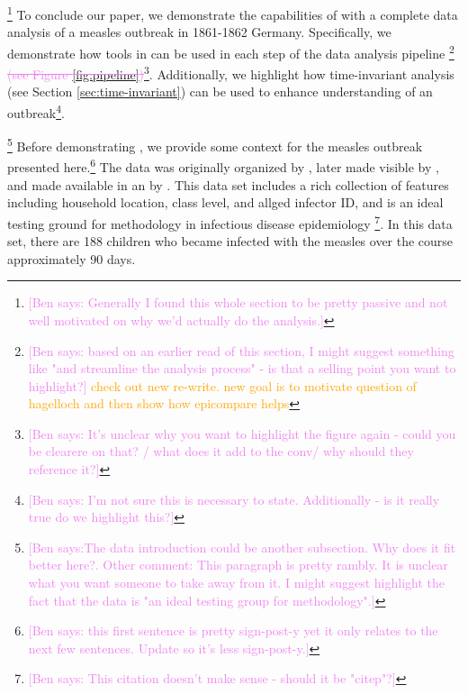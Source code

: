 \documentclass[
  shortnames]{jss}
\begin{document}
\footnote{\textcolor{violet}{[Ben says: Generally I found this whole section to be pretty passive and not well motivated on why we'd actually do the analysis.]}}
To conclude our paper, we demonstrate the capabilities of
 with a complete data analysis of a measles outbreak in
1861-1862 Germany. Specifically, we demonstrate how tools in
 can be used in each step of the data analysis pipeline
\footnote{\textcolor{violet}{[Ben says: based on an earlier read of this section, I might suggest something like "and streamline the analysis process" - is that a selling point you want to highlight?]} \textcolor{orange}{check out new re-write.  new goal is to motivate question of hagelloch and then show how epicompare helps}}
\textcolor{violet}{\sout{(see Figure \ref{fig:pipeline})}}\footnote{\textcolor{violet}{[Ben says: It's unclear why you want to highlight the figure again - could you be clearere on that? / what does it add to the conv/ why should they reference it?]}}.
Additionally, we highlight how time-invariant analysis (see Section
\ref{sec:time-invariant}) can be used to enhance understanding of an
outbreak\footnote{\textcolor{violet}{[Ben says: I'm not sure this is necessary to state. Additionally - is it really true do we highlight this?]}}.

\footnote{\textcolor{violet}{[Ben says:The data introduction could be another subsection. Why does it fit better here?.   Other comment: This paragraph is pretty rambly. It is unclear what you want someone to take away from it. I might suggest highlight the fact that the data is "an ideal testing group for methodology".]}}
Before demonstrating , we provide some context for the
measles outbreak presented
here.\footnote{\textcolor{violet}{[Ben says: this first sentence is pretty sign-post-y yet it only relates to the next few sentences. Update so it's less sign-post-y.]}}
The data was originally organized by \cite{pfeilsticker1863}, later made
visible by \cite{oesterle1992}, and made available in an  by
\cite{surveillance2017}. This data set includes a rich collection of
features including household location, class level, and allged infector
ID, and is an ideal testing ground for methodology in infectious disease
epidemiology
\cite{Neal2004,britton2011,groendyke2012,becker2016}\footnote{\textcolor{violet}{[Ben says: This citation doesn't make sense - should it be "citep"?]}}.
In this data set, there are 188 children who became infected with the
measles over the course approximately 90 days.
\end{document}
